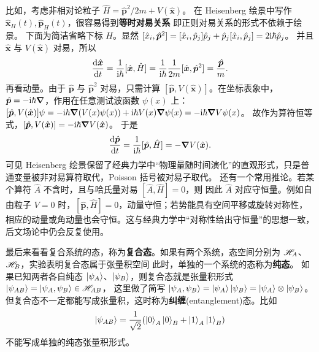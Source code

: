 比如，考虑非相对论粒子 $\hat H={\hat{\bm p}^2}/{2m}+V(\hat{\bm x})$。
在 Heisenberg 绘景中写作 $\hat{\bm x}_H(t),\hat{\bm p}_H(t)$，很容易得到\textbf{等时对易关系}
即正则对易关系的形式不依赖于绘景。
下面为简洁省略下标 $H$。显然 $[\hat x_i,\hat{\bm p}^2]=[\hat x_i,\hat p_j]\hat p_j+\hat p_j[\hat x_i,\hat p_j]=2\mathrm{i}\hbar\hat p_j$。
并且 $\hat{\bm x}$ 与 $V(\hat{\bm x})$ 对易，所以
\[
    \dv{\hat{\bm x}}{t}
    =
    \frac{1}{\mathrm{i}\hbar}[\hat{\bm x},\hat H]
    =
    \frac{1}{\mathrm{i}\hbar}\frac{1}{2m}[\hat{\bm x},\hat{\bm p}^2]
    =
    \frac{\hat{\bm p}}{m}.
\]
再看动量。由于 $\hat{\bm p}$ 与 $\hat{\bm p}^2$ 对易，只需计算 $[\hat{\bm p},V(\hat{\bm x})]$。在坐标表象中，$\hat{\bm p}=-\mathrm{i}\hbar\grad$，作用在任意测试波函数 $\psi(x)$ 上：$[\hat{\bm p},V(\hat{\bm x})]\psi=-\mathrm{i}\hbar\grad(V(x)\psi(x))+\mathrm{i}\hbar V(x)\grad\psi(x)=-\mathrm{i}\hbar\grad V\psi(x)$。
故作为算符恒等式，$[\hat{\bm p},V(\hat{\bm x})]=-\mathrm{i}\hbar \grad V(\hat{\bm x})$。
于是
\[
    \dv{\hat{\bm p}}{t}
    =
    \frac{1}{\mathrm{i}\hbar}[\hat{\bm p},\hat H]
    =
    -\grad V(\hat{\bm x}).
\]
可见 Heisenberg 绘景保留了经典力学中“物理量随时间演化”的直观形式，只是普通变量被非对易算符取代，Poisson 括号被对易子取代。
还有一个常用推论。若某个算符 $\hat A$ 不含时，且与哈氏量对易 $[\hat A,\hat H]=0$，则
因此 $\hat A$ 对应守恒量。例如自由粒子 $V=0$ 时，$[\hat{\bm p},\hat H]=0$，动量守恒；若势能具有空间平移或旋转对称性，相应的动量或角动量也会守恒。这与经典力学中“对称性给出守恒量”的思想一致，后文场论中仍会反复使用。

最后来看看复合系统的态，称为\textbf{复合态}。如果有两个系统，态空间分别为 $\mathscr{H}_A$、$\mathscr{H}_B$，实验表明复合态属于张量积空间
此时，单独的一个系统的态称为\textbf{纯态}。
如果已知两者各自纯态 $\ket{\psi_A}$、$\ket{\psi_B}$，则复合态就是张量积形式 $\ket{\psi_{AB}}=\ket{\psi_A,\psi_B} \in \mathscr{H}_{AB}$，
这里做了简写 $\ket{\psi_A,\psi_B}=\ket{\psi_A}\ket{\psi_B}=\ket{\psi_A}\otimes\ket{\psi_B}$。
但复合态不一定都能写成张量积，这时称为\textbf{纠缠}(entanglement)态。比如
\[
\ket{\psi_{AB}}=\frac{1}{\sqrt{2}}(\ket{0}_A\ket{0}_B+\ket{1}_A\ket{1}_B)
\]
不能写成单独的纯态张量积形式。

